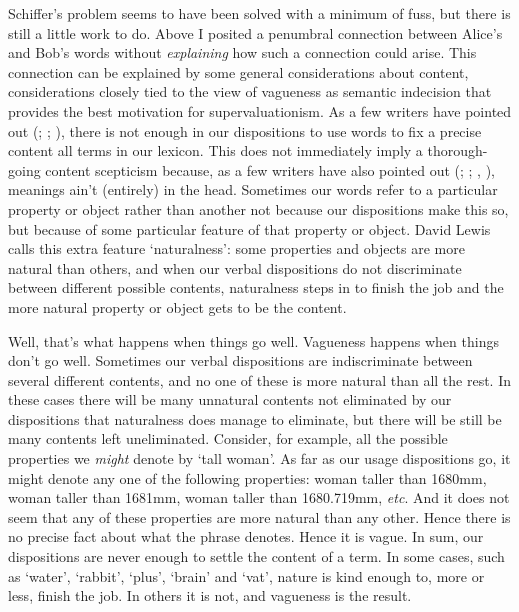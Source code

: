 \documentclass[
  10pt,
  letterpaper,
  DIV=11,
  numbers=noendperiod,
  twoside]{scrartcl}
\begin{document}
Schiffer's problem seems to have been solved with a minimum of fuss, but
there is still a little work to do. Above I posited a penumbral
connection between Alice's and Bob's words without \emph{explaining} how
such a connection could arise. This connection can be explained by some
general considerations about content, considerations closely tied to the
view of vagueness as semantic indecision that provides the best
motivation for supervaluationism. As a few writers have pointed out
(; ; ), there is not enough in
our dispositions to use words to fix a precise content all terms in our
lexicon. This does not immediately imply a thorough-going content
scepticism because, as a few writers have also pointed out
(;
; , ), meanings ain't (entirely) in
the head. Sometimes our words refer to a particular property or object
rather than another not because our dispositions make this so, but
because of some particular feature of that property or object. David
Lewis calls this extra feature `naturalness': some properties and
objects are more natural than others, and when our verbal dispositions
do not discriminate between different possible contents, naturalness
steps in to finish the job and the more natural property or object gets
to be the content.

Well, that's what happens when things go well. Vagueness happens when
things don't go well. Sometimes our verbal dispositions are
indiscriminate between several different contents, and no one of these
is more natural than all the rest. In these cases there will be many
unnatural contents not eliminated by our dispositions that naturalness
does manage to eliminate, but there will be still be many contents left
uneliminated. Consider, for example, all the possible properties we
\emph{might} denote by `tall woman'. As far as our usage dispositions
go, it might denote any one of the following properties: woman taller
than 1680mm, woman taller than 1681mm, woman taller than 1680.719mm,
\emph{etc}. And it does not seem that any of these properties are more
natural than any other. Hence there is no precise fact about what the
phrase denotes. Hence it is vague. In sum, our dispositions are never
enough to settle the content of a term. In some cases, such as `water',
`rabbit', `plus', `brain' and `vat', nature is kind enough to, more or
less, finish the job. In others it is not, and vagueness is the result.
\end{document}
